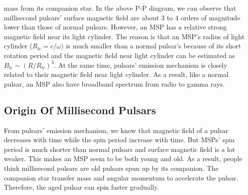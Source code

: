 \documentclass[12pt]{report}
\begin{document}
        mass from its 
        companion star. In the above P-$\dot{\mathrm{P}}$ diagram, we can observe that millisecond pulsars' 
        surface magnetic field are about 3 to 4 orders of magnitude lower than those of normal pulsars. However,
        an MSP has a relative strong magnetic field near its light cylinder. The reason is that an MSP's radius 
        of light cylinder ($R_{lc}=c/\omega)$ is much smaller than a normal pulsar's because of its short 
        rotation period and the magnetic field near light cylinder can be estimated as 
        $B_{lc}\sim\left(R/R_{lc}\right)^3$. At the same time, pulsars' emission mechanism is closely related 
        to their magnetic field near light cylinder. As a result, like a normal pulsar, an MSP also have 
        broadband spectrum from radio to gamma rays. 
        \subsection{Origin Of Millisecond Pulsars}
            From pulsars' emission mechanism, we know that magnetic field of a pulsar decreases with time while 
            the spin period increase with time. But MSPs' spin period is much shorter than normal pulsars and 
            surface magnetic field is a lot weaker. This makes an MSP seem to be both young and old. As a result,
            people think millisecond pulsars are old pulsars spun up by its companion. The companion star transfer
            mass and angular momentum to accelerate the pulsar. Therefore, the aged pulsar can spin faster 
            gradually. 
\end{document}
